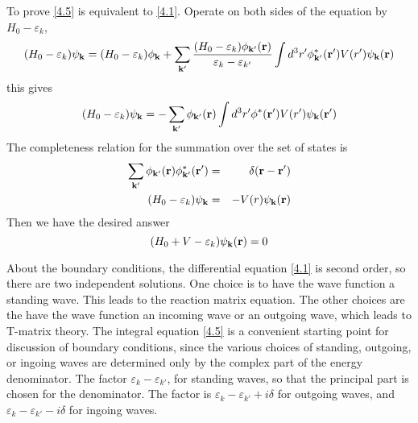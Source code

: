 To prove \eqref{4.5} is equivalent to \eqref{4.1}. Operate on both sides of the equation by $H_0 - \varepsilon_k$,
\begin{equation}
    (H_0 -\varepsilon_k) \psi_{\mathbf{k}} = (H_0 -\varepsilon_k) \phi_{\mathbf{k}} + \sum_{\mathbf{k}'} \frac{(H_0-\varepsilon_k) \phi_{\mathbf{k}'}(\mathbf{r})}{\varepsilon_k - \varepsilon_{k'}} \int d^3 r'\phi^*_{\mathbf{k}'}(\mathbf{r}') V(r') \psi_{\mathbf{k}}(\mathbf{r})
\end{equation}
this gives
\begin{equation}
    (H_0 - \varepsilon_k) \psi_{\mathbf{k}} = - \sum_{\mathbf{k}'} \phi_{\mathbf{k}'}(\mathbf{r}) \int d^3 r' \phi^*(\mathbf{r}') V(r') \psi_{\mathbf{k}}(\mathbf{r}')   \label{4.9}
\end{equation}
The completeness relation for the summation over the set of states is
\begin{eqnarray}
    \sum_{\mathbf{k}'} \phi_{\mathbf{k}'} (\mathbf{r}) \phi_{\mathbf{k}'}^* (\mathbf{r}') &=& \delta (\mathbf{r}- \mathbf{r}')   \label{4.10} \\
    (H_0 -\varepsilon_k) \psi_{\mathbf{k}} &=& -V(r) \psi_{\mathbf{k}}(\mathbf{r}) \label{4.11}
\end{eqnarray}
Then we have the desired answer
\begin{equation}
    (H_0 + V -\varepsilon_k) \psi_{\mathbf{k}} (\mathbf{r}) = 0     \label{4.12}
\end{equation}

About the boundary conditions, the differential equation \eqref{4.1} is second order, so there are two independent solutions.
One choice is to have the wave function a standing wave.
This leads to the reaction matrix equation.
The other choices are the have the wave function an incoming wave or an outgoing wave, which leads to T-matrix theory.
The integral equation \eqref{4.5} is a convenient starting point for discussion of boundary conditions, since the various choices of standing, outgoing, or ingoing waves are determined only by the complex part of the energy denominator.
The factor $\varepsilon_k - \varepsilon_{k'}$, for standing waves, so that the principal part is chosen for the denominator.
The factor is $\varepsilon_k - \varepsilon_{k'} + i\delta$ for outgoing waves, and $\varepsilon_k -\varepsilon_{k'} - i \delta$ for ingoing waves.

